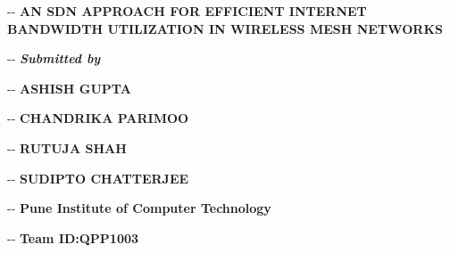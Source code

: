 \documentclass[12pt]{article}
\title{}
\makeatletter
\newenvironment{indentation}[3]%
	{\par\setlength{\parindent}{#3}
	\setlength{\leftmargin}{#1}       \setlength{\rightmargin}{#1}%
	\advance\linewidth -\leftmargin       \advance\linewidth -\rightmargin%
	\advance\@totalleftmargin\leftmargin  \@setpar{{\@@par}}%
	\parshape 1\@totalleftmargin \linewidth\ignorespaces}{\par}%
\makeatother
\begin{document}
\begin{center}
\begin{indentation}{0pt}{0pt}{0pt}
\vspace{10cm}
\textbf{{\Large AN SDN APPROACH FOR EFFICIENT INTERNET BANDWIDTH UTILIZATION IN WIRELESS MESH NETWORKS}}
\end{indentation}
\end{center}

\vspace{0.5cm}

\begin{center}
\begin{indentation}{0pt}{0pt}{0pt}
{\large{\textbf {\textit {Submitted by}}}}
\end{indentation}
\end{center}
\vspace{0.5cm}

\begin{center}
\begin{indentation}{0pt}{0pt}{0pt}
{\large \bf ASHISH GUPTA}
\end{indentation}
\end{center}

\begin{center}
\begin{indentation}{0pt}{0pt}{0pt}
{\large \bf CHANDRIKA PARIMOO}
\end{indentation}
\end{center}

\begin{center}
\begin{indentation}{0pt}{0pt}{0pt}
{\large \bf RUTUJA SHAH}
\end{indentation}
\end{center}

\begin{center}
\begin{indentation}{0pt}{0pt}{0pt}
{\large \bf SUDIPTO CHATTERJEE}
\end{indentation}
\end{center}
\vspace{1cm}

\begin{center}
\begin{indentation}{0pt}{0pt}{0pt}
{\large \bf Pune Institute of Computer Technology}
\end{indentation}
\end{center}

\begin{center}
\begin{indentation}{0pt}{0pt}{0pt}
{\large \bf Team ID:QPP1003}
\end{indentation}
\end{center}
\pagebreak
\end{document}
